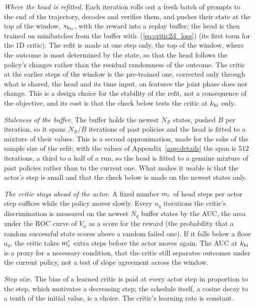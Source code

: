 \emph{Where the head is refitted.} Each iteration rolls out a fresh batch of prompts to the end of the trajectory, decodes and verifies them, and pushes their state at the top of the window, $s_{k_{\rm hi}}$, with the reward into a replay buffer; the head is then trained on minibatches from the buffer with~(\ref{eq:critic2d_loss}) (its first term for the 1D critic). The refit is made at one step only, the top of the window, where the outcome is most determined by the state, so that the head follows the policy's changes rather than the residual randomness of the outcome. The critic at the earlier steps of the window is the pre-trained one, corrected only through what is shared, the head and its time input, on features the joint phase does not change. This is a design choice for the stability of the refit, not a consequence of the objective, and its cost is that the check below tests the critic at $k_{\rm hi}$ only.

\emph{Staleness of the buffer.} The buffer holds the newest $N_{\mathcal B}$ states, pushed $B$ per iteration, so it spans $N_{\mathcal B}/B$ iterations of past policies and the head is fitted to a mixture of their values. This is a second approximation, made for the sake of the sample size of the refit; with the values of Appendix~\ref{app:details} the span is $512$ iterations, a third to a half of a run, so the head is fitted to a genuine mixture of past policies rather than to the current one. What makes it usable is that the actor's step is small and that the check below is made on the newest states only.

\emph{The critic stays ahead of the actor.} A fixed number $m_{\rm c}$ of head steps per actor step suffices while the policy moves slowly. Every $n_q$ iterations the critic's discrimination is measured on the newest $N_q$ buffer states by the AUC, the area under the ROC curve of $V_\phi$ as a score for the reward (the probability that a random successful state scores above a random failed one). If it falls below a floor $a_0$, the critic takes $m'_{\rm c}$ extra steps before the actor moves again. The AUC at $k_{\rm hi}$ is a proxy for a necessary condition, that the critic still separates outcomes under the current policy, not a test of slope agreement across the window.

\emph{Step size.} The bias of a learned critic is paid at every actor step in proportion to the step, which motivates a decreasing step; the schedule itself, a cosine decay to a tenth of the initial value, is a choice. The critic's learning rate is constant.

